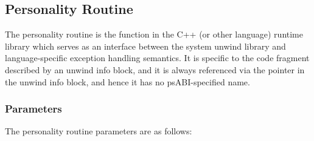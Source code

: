 \subsection{Personality Routine}


The personality routine is the function in the C++ (or other language)
runtime library which serves as an interface between the system
unwind library and language-specific exception handling semantics.
It is specific to the code fragment described by an unwind info block,
and it is always referenced via the pointer in the unwind info block,
and hence it has no psABI-specified name.

\subsubsection{Parameters}

The personality routine parameters are as follows:

